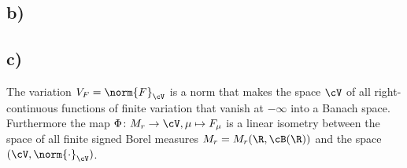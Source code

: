 \subsection{b)}


\subsection{c)}
\begin{claim}
The variation $V_F=\norm{F}_{\cV}$ is a norm that makes the space $\cV$ of all right-continuous functions of finite variation that vanish at $-\infty$ into a Banach space. Furthermore the map $\Phi\colon M_r\to\cV,\mu\mapsto F_\mu$ is a linear isometry between the space of all finite signed Borel measures $M_r=M_r(\R,\cB(\R))$ and the space $(\cV,\norm{\cdot}_\cV)$.
\end{claim}
